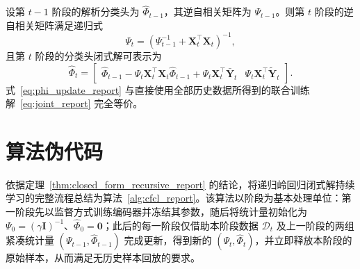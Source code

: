 \begin{theorem}[递归岭回归闭式解]\label{thm:closed_form_recursive_report}
设第 $t-1$ 阶段的解析分类头为 $\widehat{\Phi}_{t-1}$，其逆自相关矩阵为 $\Psi_{t-1}$。则第 $t$ 阶段的逆自相关矩阵满足递归式
\begin{equation}
\Psi_t=\left(\Psi_{t-1}^{-1}+\mathbf{X}_t^\top\mathbf{X}_t\right)^{-1},
\label{eq:psi_update_report}
\end{equation}
且第 $t$ 阶段的分类头闭式解可表示为
\begin{equation}
\widehat{\Phi}_t=
\begin{bmatrix}
\widehat{\Phi}_{t-1}-\Psi_t\mathbf{X}_t^\top\mathbf{X}_t\widehat{\Phi}_{t-1}+\Psi_t\mathbf{X}_t^\top\bar{\mathbf{Y}}_t
&
\Psi_t\mathbf{X}_t^\top\tilde{\mathbf{Y}}_t
\end{bmatrix}.
\label{eq:phi_update_report}
\end{equation}
式~\eqref{eq:phi_update_report} 与直接使用全部历史数据所得到的联合训练解~\eqref{eq:joint_report} 完全等价。
\end{theorem}

\section{算法伪代码}

依据定理~\ref{thm:closed_form_recursive_report} 的结论，将递归岭回归闭式解持续学习的完整流程总结为算法~\ref{alg:cfcl_report}。该算法以阶段为基本处理单位：第一阶段先以监督方式训练编码器并冻结其参数，随后将统计量初始化为 $\Psi_0=(\gamma\mathbf{I})^{-1}$、$\widehat{\Phi}_0=\mathbf{0}$；此后的每一阶段仅借助本阶段数据 $\mathcal{D}_t$ 及上一阶段的两组紧凑统计量 $(\Psi_{t-1},\widehat{\Phi}_{t-1})$ 完成更新，得到新的 $(\Psi_t,\widehat{\Phi}_t)$，并立即释放本阶段的原始样本，从而满足无历史样本回放的要求。

